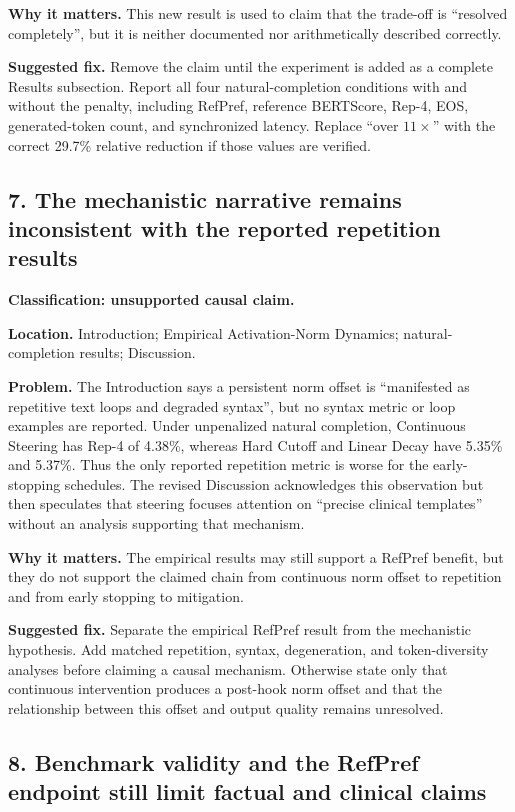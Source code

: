 \documentclass[11pt]{article}
\begin{document}
\textbf{Why it matters.} This new result is used to claim that the trade-off is ``resolved completely'', but it is neither documented nor arithmetically described correctly.

\textbf{Suggested fix.} Remove the claim until the experiment is added as a complete Results subsection.  Report all four natural-completion conditions with and without the penalty, including RefPref, reference BERTScore, Rep-4, EOS, generated-token count, and synchronized latency.  Replace ``over $11\times$'' with the correct 29.7\% relative reduction if those values are verified.

\subsection*{7. The mechanistic narrative remains inconsistent with the reported repetition results}

\textbf{Classification: unsupported causal claim.}

\textbf{Location.} Introduction; Empirical Activation-Norm Dynamics; natural-completion results; Discussion.

\textbf{Problem.} The Introduction says a persistent norm offset is ``manifested as repetitive text loops and degraded syntax'', but no syntax metric or loop examples are reported.  Under unpenalized natural completion, Continuous Steering has Rep-4 of 4.38\%, whereas Hard Cutoff and Linear Decay have 5.35\% and 5.37\%.  Thus the only reported repetition metric is worse for the early-stopping schedules.  The revised Discussion acknowledges this observation but then speculates that steering focuses attention on ``precise clinical templates'' without an analysis supporting that mechanism.

\textbf{Why it matters.} The empirical results may still support a RefPref benefit, but they do not support the claimed chain from continuous norm offset to repetition and from early stopping to mitigation.

\textbf{Suggested fix.} Separate the empirical RefPref result from the mechanistic hypothesis.  Add matched repetition, syntax, degeneration, and token-diversity analyses before claiming a causal mechanism.  Otherwise state only that continuous intervention produces a post-hook norm offset and that the relationship between this offset and output quality remains unresolved.

\subsection*{8. Benchmark validity and the RefPref endpoint still limit factual and clinical claims}
\end{document}
